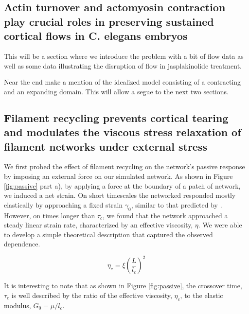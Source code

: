 \documentclass[10pt,letterpaper]{article}
\begin{document}
\subsection*{Actin turnover and actomyosin contraction play crucial roles in preserving sustained cortical flows in C. elegans embryos}

This will be a section where we introduce the problem with a bit of flow data as well as some data illustrating the disruption of flow in jasplakinolide treatment.

Near the end make a mention of the idealized model consisting of a contracting and an expanding domain.  This will allow a segue to the next two sections.

\subsection*{Filament recycling prevents cortical tearing and modulates the viscous stress relaxation of filament networks under external stress}

We first probed the effect of filament recycling on the network's passive response by imposing an external force on our simulated network.   As shown in Figure \ref{fig:passive} part a), by applying a force at the boundary of a patch of network, we induced a net strain.  On short timescales the networked responded mostly elastically by approaching a fixed strain $\gamma_0$, similar to that predicted by \cite{theo_hlm}.  However, on times longer than $\tau_c$, we found that the network approached a steady linear strain rate, characterized by an effective viscosity, $\eta$.  We were able to develop a simple theoretical description that captured the observed dependence.

\begin{equation}
\label{eqn:eff_vic}
\eta_c = \xi\left (\frac{L}{l_c}\right )^2
\end{equation}

It is interesting to note that as shown in Figure \ref{fig:passive}, the crossover time, $\tau_c$ is well described by the ratio of the effective viscosity, $\eta_c$, to the elastic modulus, $G_0 = \mu/l_c$.
\end{document}
